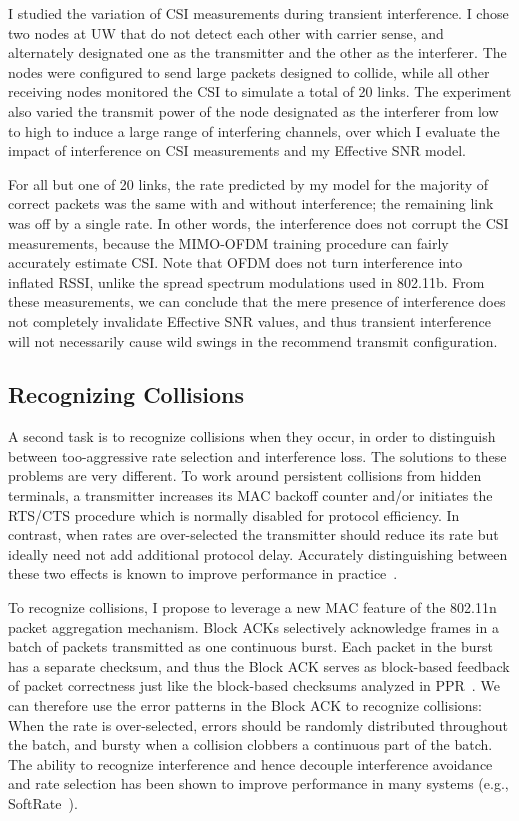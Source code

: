 I studied the variation of CSI measurements during transient interference. I chose two nodes at UW that do not detect each other with carrier sense, and alternately designated one as the transmitter and the other as the interferer. The nodes were configured to send large packets designed to collide, while all other receiving nodes monitored the CSI to simulate a total of 20 links. The experiment also varied the transmit power of the node designated as the interferer from low to high to induce a large range of interfering channels, over which I evaluate the impact of interference on CSI measurements and my Effective SNR model.

For all but one of 20 links, the rate predicted by my model for the majority of correct packets was the same with and without interference; the remaining link was off by a single rate. In other words, the interference does not corrupt the CSI measurements, because the MIMO-OFDM training procedure can fairly accurately estimate CSI. Note that OFDM does not turn interference into inflated RSSI, unlike the spread spectrum modulations used in 802.11b. From these measurements, we can conclude that the mere presence of interference does not completely invalidate Effective SNR values, and thus transient interference will not necessarily cause wild swings in the recommend transmit configuration.

\subsection{Recognizing Collisions}
A second task is to recognize collisions when they occur, in order to distinguish between too-aggressive rate selection and interference loss. The solutions to these problems are very different. To work around persistent collisions from hidden terminals, a transmitter increases its MAC backoff counter and/or initiates the RTS/CTS procedure which is normally disabled for protocol efficiency. In contrast, when rates are over-selected the transmitter should reduce its rate but ideally need not add additional protocol delay. Accurately distinguishing between these two effects is known to improve performance in practice~\cite{Wong_RRAA,Jamieson_PPR,Vutukuru_SoftRate}.

To recognize collisions, I propose to leverage a new MAC feature of the 802.11n packet aggregation mechanism. Block ACKs selectively acknowledge frames in a batch of packets transmitted as one continuous burst. Each packet in the burst has a separate checksum, and thus the Block ACK serves as block-based feedback of packet correctness just like the block-based checksums analyzed in PPR~\cite{Jamieson_PPR}. We can therefore use the error patterns in the Block ACK to recognize collisions: When the rate is over-selected, errors should be randomly distributed throughout the batch, and bursty when a collision clobbers a continuous part of the batch. The ability to recognize interference and hence decouple interference avoidance and rate selection has been shown to improve performance in many systems (e.g., SoftRate~\cite{Vutukuru_SoftRate}).


